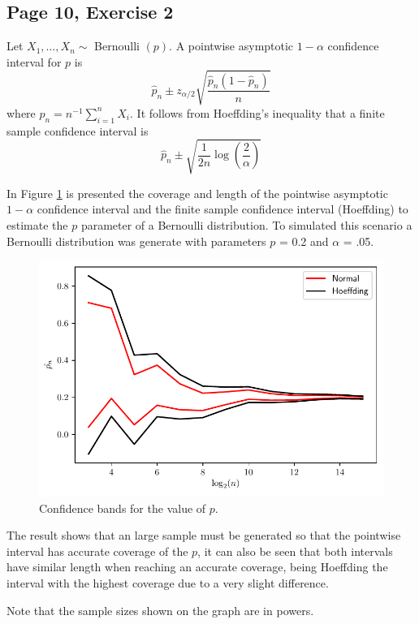 \documentclass[11pt]{article}
\theoremstyle{definition}
\theoremstyle{remark}
\theoremstyle{remark}
\begin{document}
\subsection{Page 10, Exercise 2}
Let $X_{1}, \ldots, X_{n} \sim$ Bernoulli $(p) .$ A pointwise
asymptotic $1-\alpha$ confidence interval for $p$ is
\[
  \widehat{p}_{n} \pm z_{\alpha / 2}
  \sqrt{\frac{\widehat{p}_{n}\left(1-\widehat{p}_{n}\right)}{n}}
\]
where $\widehat{p}_{n}=n^{-1} \sum_{i=1}^{n} X_{i} .$ It follows from
Hoeffding's inequality that a finite sample confidence interval is
\[
  \widehat{p}_{n} \pm \sqrt{\frac{1}{2 n} \log
    \left(\frac{2}{\alpha}\right)}
\]

In Figure \ref{fig:bands} is presented the coverage and length of the
pointwise asymptotic $1-\alpha$ confidence interval and the finite
sample confidence interval (Hoeffding) to estimate the $p$ parameter
of a Bernoulli distribution. To simulated this scenario a Bernoulli
distribution was generate with parameters $p$ = 0.2 and $\alpha$ =
.05.

\begin{figure}[H]
    \centering
    \includegraphics[scale=.5]{../figs/bernoulli_bands.pdf}
    \caption{Confidence bands for the value of $p$.}
    \label{fig:bands}
\end{figure}

The result shows that an large sample must be generated so that the
pointwise interval has accurate coverage of the $p$, it can also be
seen that both intervals have similar length when reaching an accurate
coverage, being Hoeffding the interval with the highest coverage due
to a very slight difference.

Note that the sample sizes shown on the graph are in powers.
\end{document}
